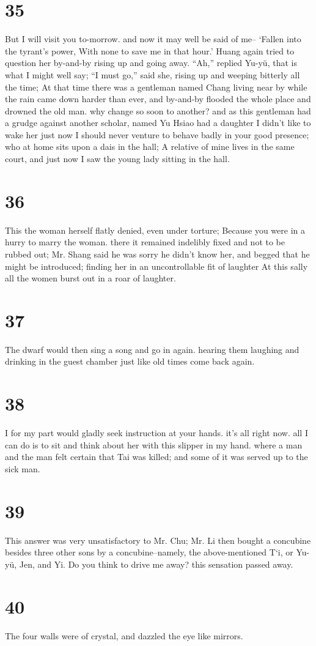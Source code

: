 \documentclass[11pt,a5paper]{book}
\begin{document}
\chapter*{\normalfont\Large 35}
But I will visit you to-morrow. and now it may well be said of me-- ‘Fallen into the tyrant’s power, With none to save me in that hour.’ Huang again tried to question her by-and-by rising up and going away. “Ah,” replied Yu-yü, that is what I might well say; “I must go,” said she, rising up and weeping bitterly all the time; At that time there was a gentleman named Chang living near by while the rain came down harder than ever, and by-and-by flooded the whole place and drowned the old man. why change so soon to another? and as this gentleman had a grudge against another scholar, named Yu Hsiao had a daughter I didn’t like to wake her just now I should never venture to behave badly in your good presence; who at home sits upon a dais in the hall; A relative of mine lives in the same court, and just now I saw the young lady sitting in the hall.
\clearpage

\chapter*{\normalfont\Large 36}
This the woman herself flatly denied, even under torture; Because you were in a hurry to marry the woman. there it remained indelibly fixed and not to be rubbed out; Mr. Shang said he was sorry he didn’t know her, and begged that he might be introduced; finding her in an uncontrollable fit of laughter At this sally all the women burst out in a roar of laughter.
\clearpage

\chapter*{\normalfont\Large 37}
The dwarf would then sing a song and go in again. hearing them laughing and drinking in the guest chamber just like old times come back again.
\clearpage

\chapter*{\normalfont\Large 38}
I for my part would gladly seek instruction at your hands. it’s all right now. all I can do is to sit and think about her with this slipper in my hand. where a man and the man felt certain that Tai was killed; and some of it was served up to the sick man.
\clearpage

\chapter*{\normalfont\Large 39}
This answer was very unsatisfactory to Mr. Chu; Mr. Li then bought a concubine besides three other sons by a concubine--namely, the above-mentioned T‘i, or Yu-yü, Jen, and Yi. Do you think to drive me away? this sensation passed away.
\clearpage

\chapter*{\normalfont\Large 40}
The four walls were of crystal, and dazzled the eye like mirrors.
\clearpage
\end{document}
